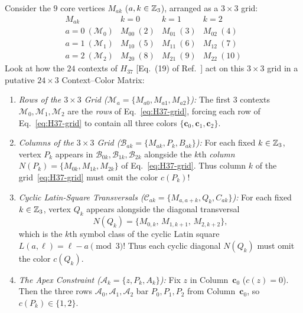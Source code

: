 \documentclass[aps,pra,reprint,superscriptaddress,longbibliography,nofootinbib,floatfix,10pt]{revtex4-2}
\theoremstyle{definition}\newtheorem{definition}[theorem]{Definition}
\theoremstyle{remark}\newtheorem{remark}[theorem]{Remark}
\begin{document}
Consider the $9$ core vertices $M_{ak}$ ($a,k\in\mathbb Z_3$), arranged as a $3\times 3$ grid:
\begin{equation}\label{eq:H37-grid}
\begin{array}{c|ccc}
M_{ak} & k=0 & k=1 & k=2\\\hline
a=0\ (\mathcal{M}_0) & M_{00}\ (2) & M_{01}\ (3) & M_{02}\ (4)\\
a=1\ (\mathcal{M}_1) & M_{10}\ (5) & M_{11}\ (6) & M_{12}\ (7)\\
a=2\ (\mathcal{M}_2) & M_{20}\ (8) & M_{21}\ (9) & M_{22}\ (10)
\end{array}
\end{equation}
Look at how the $24$ contexts of $H_{37}$ [Eq.~(19) of Ref.~\cite{svozil-2025-color}] act on this $3\times 3$ grid in a putative $24\times 3$ Context--Color Matrix:
\begin{enumerate}
\item \emph{Rows of the $3\times 3$ Grid ($\mathcal{M}_a=\{M_{a0},M_{a1},M_{a2}\}$):} The first $3$ contexts $\mathcal{M}_0,\mathcal{M}_1,\mathcal{M}_2$ are the \emph{rows} of Eq.~\eqref{eq:H37-grid}, forcing each row of Eq.~\eqref{eq:H37-grid} to contain all three colors $\{\mathbf{c}_0,\mathbf{c}_1,\mathbf{c}_2\}$.
\item \emph{Columns of the $3\times 3$ Grid ($\mathcal{B}_{ak}=\{M_{ak},P_k,B_{ak}\}$):} For each fixed $k\in\mathbb Z_3$, vertex $P_k$ appears in $\mathcal{B}_{0k},\mathcal{B}_{1k},\mathcal{B}_{2k}$ alongside the $k$th \emph{column} $N(P_k)=\{M_{0k},M_{1k},M_{2k}\}$ of Eq.~\eqref{eq:H37-grid}. Thus column $k$ of the grid~\eqref{eq:H37-grid} must omit the color $c(P_k)$!
\item \emph{Cyclic Latin-Square Transversals ($\mathcal{C}_{ak}=\{M_{a,a+k},Q_k,C_{ak}\}$):} For each fixed $k\in\mathbb Z_3$, vertex $Q_k$ appears alongside the diagonal transversal
\[
N(Q_k)=\{M_{0,k},\,M_{1,k+1},\,M_{2,k+2}\},
\]
which is the $k$th symbol class of the cyclic Latin square $L(a,\ell)=\ell-a\pmod 3$! Thus each cyclic diagonal $N(Q_k)$ must omit the color $c(Q_k)$.
\item \emph{The Apex Constraint ($\mathcal{A}_k=\{z,P_k,A_k\}$):} Fix $z$ in Column~$\mathbf{c}_0$ ($c(z)=0$). Then the three rows $\mathcal{A}_0,\mathcal{A}_1,\mathcal{A}_2$ bar $P_0,P_1,P_2$ from Column~$\mathbf{c}_0$, so $c(P_k)\in\{1,2\}$.
\end{enumerate}
\end{document}
